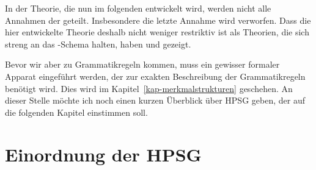 In der Theorie, die nun im folgenden entwickelt wird, werden nicht alle Annahmen
der \xbart geteilt. Insbesondere die letzte Annahme wird verworfen. Dass die
hier entwickelte Theorie deshalb nicht weniger restriktiv ist als Theorien,
die sich streng an das \xbar-Schema halten, haben \citet{Pullum85a} und \citet{KP90a}
gezeigt.

Bevor wir aber zu Grammatikregeln kommen, muss ein gewisser formaler Apparat eingeführt
werden, der zur exakten Beschreibung der Grammatikregeln benötigt wird. Dies wird
im Kapitel~\ref{kap-merkmalstrukturen} geschehen. An dieser Stelle möchte
ich noch einen kurzen Überblick über HPSG geben, der auf die folgenden Kapitel einstimmen soll.





\section{Einordnung der HPSG}
\label{sec-grundlegendes}


